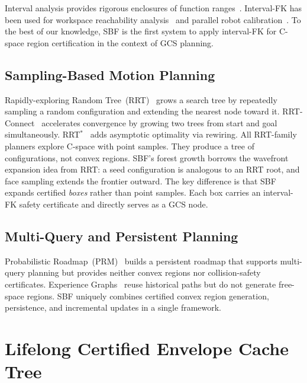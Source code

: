 \documentclass[letterpaper, conference]{IEEEtran}
\begin{document}
Interval analysis provides rigorous enclosures of function
ranges~\cite{moore2009introduction,jaulin2001applied}.
Interval-FK has been used for workspace reachability
analysis~\cite{merlet2004solving} and parallel robot
calibration~\cite{daney2006interval}.
To the best of our knowledge, SBF is the first system to apply
interval-FK for C-space region certification in the context of GCS
planning.

\subsection{Sampling-Based Motion Planning}

Rapidly-exploring Random Tree~(RRT)~\cite{lavalle1998rapidly} grows a search tree by repeatedly
sampling a random configuration and extending the nearest node toward
it.
RRT-Connect~\cite{kuffner2000rrt} accelerates convergence by growing
two trees from start and goal simultaneously.
RRT$^*$~\cite{karaman2011sampling} adds asymptotic optimality via
rewiring.
All RRT-family planners explore C-space with point samples.
They produce a tree of configurations, not convex regions.
SBF's forest growth borrows the wavefront expansion idea from RRT:
a seed configuration is analogous to an RRT root, and face sampling
extends the frontier outward.
The key difference is that SBF expands certified \emph{boxes}
rather than point samples.
Each box carries an interval-FK safety certificate and directly
serves as a GCS node.

\subsection{Multi-Query and Persistent Planning}

Probabilistic Roadmap~(PRM)~\cite{kavraki1996probabilistic} builds a persistent roadmap that
supports multi-query planning but provides neither convex regions nor
collision-safety certificates.
Experience Graphs~\cite{phillips2012experience} reuse historical paths but
do not generate free-space regions.
SBF uniquely combines certified convex region generation, persistence, and
incremental updates in a single framework.

\section{Lifelong Certified Envelope Cache Tree}
\label{sec:certification}
\end{document}
